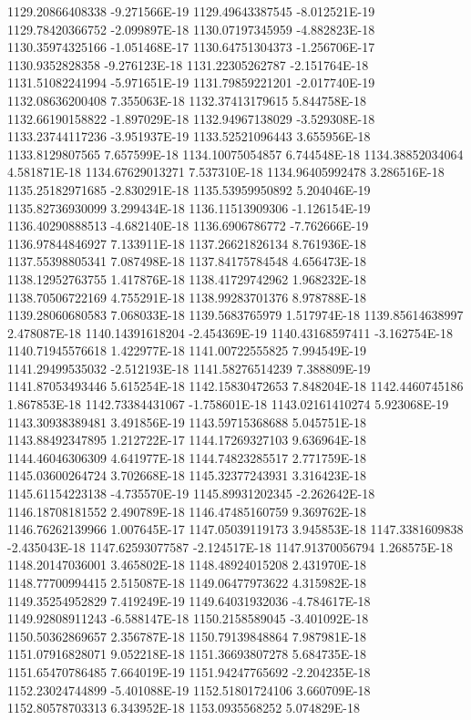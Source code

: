 1129.20866408338  -9.271566E-19
1129.49643387545  -8.012521E-19
1129.78420366752  -2.099897E-18
1130.07197345959  -4.882823E-18
1130.35974325166  -1.051468E-17
1130.64751304373  -1.256706E-17
1130.9352828358  -9.276123E-18
1131.22305262787  -2.151764E-18
1131.51082241994  -5.971651E-19
1131.79859221201  -2.017740E-19
1132.08636200408  7.355063E-18
1132.37413179615  5.844758E-18
1132.66190158822  -1.897029E-18
1132.94967138029  -3.529308E-18
1133.23744117236  -3.951937E-19
1133.52521096443  3.655956E-18
1133.8129807565  7.657599E-18
1134.10075054857  6.744548E-18
1134.38852034064  4.581871E-18
1134.67629013271  7.537310E-18
1134.96405992478  3.286516E-18
1135.25182971685  -2.830291E-18
1135.53959950892  5.204046E-19
1135.82736930099  3.299434E-18
1136.11513909306  -1.126154E-19
1136.40290888513  -4.682140E-18
1136.6906786772  -7.762666E-19
1136.97844846927  7.133911E-18
1137.26621826134  8.761936E-18
1137.55398805341  7.087498E-18
1137.84175784548  4.656473E-18
1138.12952763755  1.417876E-18
1138.41729742962  1.968232E-18
1138.70506722169  4.755291E-18
1138.99283701376  8.978788E-18
1139.28060680583  7.068033E-18
1139.5683765979  1.517974E-18
1139.85614638997  2.478087E-18
1140.14391618204  -2.454369E-19
1140.43168597411  -3.162754E-18
1140.71945576618  1.422977E-18
1141.00722555825  7.994549E-19
1141.29499535032  -2.512193E-18
1141.58276514239  7.388809E-19
1141.87053493446  5.615254E-18
1142.15830472653  7.848204E-18
1142.4460745186  1.867853E-18
1142.73384431067  -1.758601E-18
1143.02161410274  5.923068E-19
1143.30938389481  3.491856E-19
1143.59715368688  5.045751E-18
1143.88492347895  1.212722E-17
1144.17269327103  9.636964E-18
1144.46046306309  4.641977E-18
1144.74823285517  2.771759E-18
1145.03600264724  3.702668E-18
1145.32377243931  3.316423E-18
1145.61154223138  -4.735570E-19
1145.89931202345  -2.262642E-18
1146.18708181552  2.490789E-18
1146.47485160759  9.369762E-18
1146.76262139966  1.007645E-17
1147.05039119173  3.945853E-18
1147.3381609838  -2.435043E-18
1147.62593077587  -2.124517E-18
1147.91370056794  1.268575E-18
1148.20147036001  3.465802E-18
1148.48924015208  2.431970E-18
1148.77700994415  2.515087E-18
1149.06477973622  4.315982E-18
1149.35254952829  7.419249E-19
1149.64031932036  -4.784617E-18
1149.92808911243  -6.588147E-18
1150.2158589045  -3.401092E-18
1150.50362869657  2.356787E-18
1150.79139848864  7.987981E-18
1151.07916828071  9.052218E-18
1151.36693807278  5.684735E-18
1151.65470786485  7.664019E-19
1151.94247765692  -2.204235E-18
1152.23024744899  -5.401088E-19
1152.51801724106  3.660709E-18
1152.80578703313  6.343952E-18
1153.0935568252  5.074829E-18
